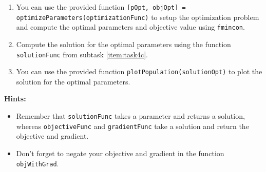 \begin{enumerate}[label=\alph*)]
\begin{enumerate}[label=\arabic*.]
        \item You can use the provided function \lstinline|[pOpt, objOpt] = optimizeParameters(optimizationFunc)| to setup the optimization problem and compute the optimal parameters and objective value using \lstinline|fmincon|.
        \item Compute the solution for the optimal parameters using the function \lstinline|solutionFunc| from subtask \ref{item:task4c}.
        \item You can use the provided function \lstinline|plotPopulation(solutionOpt)| to plot the solution for the optimal parameters.
    \end{enumerate}
    \textbf{Hints:}
    \begin{itemize}
        \item Remember that \lstinline|solutionFunc| takes a parameter and returns a solution, whereas \lstinline|objectiveFunc| and \lstinline|gradientFunc| take a solution and return the objective and gradient.
        \item Don't forget to negate your objective and gradient in the function \lstinline|objWithGrad|.
    \end{itemize}
\end{enumerate}
